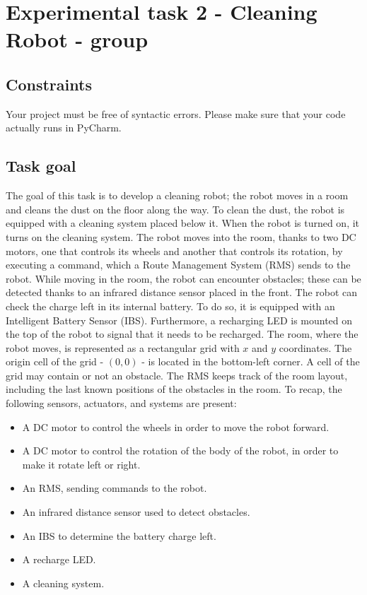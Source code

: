 \chapter{Experimental task 2 - Cleaning Robot - \notdd group}
\section{Constraints}
Your project must be free of syntactic errors. Please make sure that your code actually runs in PyCharm.


\section{Task goal}
The goal of this task is to develop a cleaning robot; the robot moves in a room and cleans the dust on the floor along the way. To clean the dust, the robot is equipped with a cleaning system placed below it. When the robot is turned on, it turns on the cleaning system.
The robot moves into the room, thanks to two DC motors, one that controls its wheels and another that controls its rotation, by executing a command, which a Route Management System (RMS) sends to the robot. While moving in the room, the robot can encounter obstacles; these can be detected thanks to an infrared distance sensor placed in the front.
The robot can check the charge left in its internal battery. To do so, it is equipped with an Intelligent Battery Sensor (IBS). Furthermore, a recharging LED is mounted on the top of the robot to signal that it needs to be recharged.
The room, where the robot moves, is represented as a rectangular grid with $x$ and $y$ coordinates. The origin cell of the grid - \ie $(0,0)$ - is located in the bottom-left corner. A cell of the grid may contain or not an obstacle. The RMS keeps track of the room layout, including the last known positions of the obstacles in the room.
To recap, the following sensors, actuators, and systems are present:
\begin{itemize}
    \item A DC motor to control the wheels in order to move the robot forward.
    \item A DC motor to control the rotation of the body of the robot, in order to make it rotate left or right.
    \item An RMS, sending commands to the robot.
    \item An infrared distance sensor used to detect obstacles.
    \item An IBS to determine the battery charge left.
    \item A recharge LED.
    \item A cleaning system.
\end{itemize}

